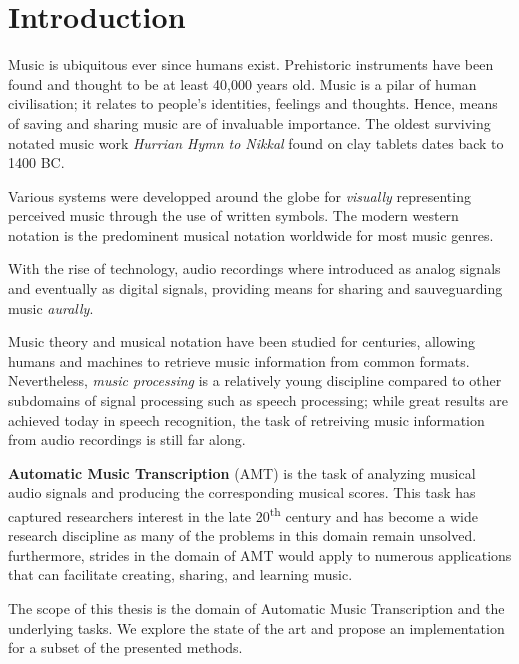 \documentclass[american,]{article}
\begin{document}
\def\X{\boldsymbol{X}}
\def\V{\boldsymbol{V}}
\def\W{\boldsymbol{W}}
\def\H{\boldsymbol{H}}

\pagebreak

\hypertarget{introduction}{%
\section*{Introduction}\label{introduction}}

Music is ubiquitous ever since humans exist.
Prehistoric instruments have been found and thought to be at least
40,000 years old.
Music is a pilar of human civilisation; it relates to people's identities,
feelings and thoughts.
Hence, means of saving and sharing music are of invaluable importance.
The oldest surviving notated music work \emph{Hurrian Hymn to Nikkal}
found on clay tablets dates back to 1400 BC.

Various systems were developped around the globe for \emph{visually}
representing perceived music through the use of written symbols.
The modern western notation is the predominent musical notation
worldwide for most music genres.

With the rise of technology, audio recordings where introduced
as analog signals and eventually as digital signals,
providing means for sharing and sauveguarding music \emph{aurally}.

Music theory and musical notation have been studied for centuries,
allowing humans and machines to retrieve music information
from common formats.
Nevertheless, \emph{music processing} is a relatively young discipline
compared to other subdomains of signal processing such as speech
processing; while great results are achieved today in speech recognition,
the task of retreiving music information from audio recordings
is still far along.

\textbf{Automatic Music Transcription} (AMT) is the task of analyzing
musical audio signals and producing the corresponding musical scores.
This task has captured researchers interest in the late 20\textsuperscript{th} century
and has become a wide research discipline as many of the problems
in this domain remain unsolved.
furthermore, strides in the domain of AMT would apply to numerous
applications that can facilitate creating, sharing, and learning music.

The scope of this thesis is the domain of Automatic Music Transcription
and the underlying tasks.
We explore the state of the art and propose an implementation
for a subset of the presented methods.
\end{document}
